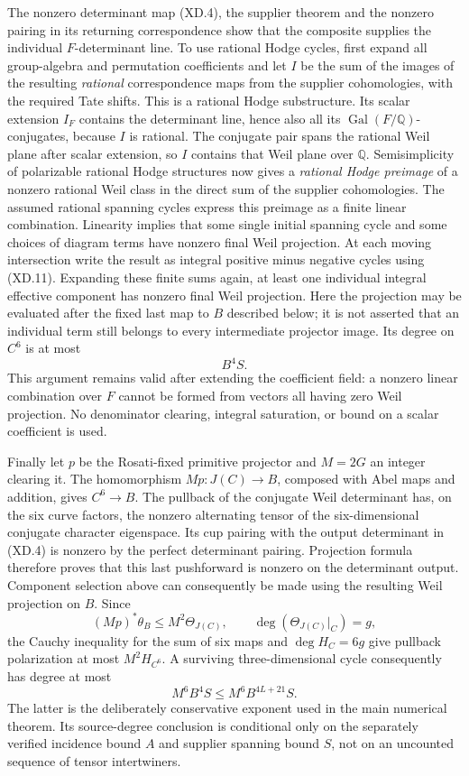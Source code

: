 The nonzero determinant map (XD.4), the supplier theorem and the
nonzero pairing in its returning correspondence show that the
composite supplies the individual \(F\)-determinant line.
To use rational Hodge cycles, first expand all group-algebra and
permutation coefficients and let \(I\) be the sum of the images
of the resulting \emph{rational} correspondence maps from the
supplier cohomologies, with the required Tate shifts.
This is a rational Hodge substructure.  Its scalar extension
\(I_F\) contains the determinant line, hence also all its
\(\operatorname{Gal}(F/\mathbb Q)\)-conjugates, because \(I\)
is rational.  The conjugate pair spans the rational Weil
plane after scalar extension, so \(I\) contains that Weil
plane over \(\mathbb Q\).
Semisimplicity of polarizable rational Hodge structures now
gives a \emph{rational Hodge preimage} of a nonzero rational
Weil class in the direct sum of the supplier cohomologies.
The assumed rational spanning cycles express this preimage
as a finite linear combination.  Linearity implies that
some single initial spanning cycle and some choices of diagram
terms have nonzero final Weil projection.  At each moving
intersection write the result as integral positive minus negative
cycles using (XD.11).  Expanding these finite sums again, at least
one individual integral effective component has nonzero final
Weil projection.  Here the projection may be evaluated after the
fixed last map to \(B\) described below; it is not asserted that
an individual term still belongs to every intermediate projector
image.  Its degree on \(C^6\) is at most
\[
                              B^4S.                         \tag{XD.12}
\]
This argument remains valid after extending the coefficient field:
a nonzero linear combination over \(F\) cannot be formed from
vectors all having zero Weil projection.  No denominator clearing,
integral saturation, or bound on a scalar coefficient is used.

Finally let \(p\) be the Rosati-fixed primitive projector and
\(M=2G\) an integer clearing it.  The homomorphism \(Mp:J(C)\to B\),
composed with Abel maps and addition, gives \(C^6\to B\).
The pullback of the conjugate Weil determinant has, on the six
curve factors, the nonzero alternating tensor of the six-dimensional
conjugate character eigenspace.  Its cup pairing with the output
determinant in (XD.4) is nonzero by the perfect determinant pairing.
Projection formula therefore proves that this last pushforward
is nonzero on the determinant output.  Component selection above
can consequently be made using the resulting Weil projection on
\(B\).  Since
\[
 (Mp)^*\theta_B\leq M^2\Theta_{J(C)},\qquad
 \deg(\Theta_{J(C)}|_C)=g,
\]
the Cauchy inequality for the sum of six maps and
\(\deg H_C=6g\) give pullback polarization at most \(M^2H_{C^6}\).
A surviving three-dimensional cycle consequently has degree at most
\[
                         M^6B^4S
                       \leq M^6B^{4L+21}S.                 \tag{XD.13}
\]
The latter is the deliberately conservative exponent used in the
main numerical theorem.  Its source-degree conclusion is conditional
only on the separately verified incidence bound \(A\) and supplier
spanning bound \(S\), not on an uncounted sequence of tensor
intertwiners.
